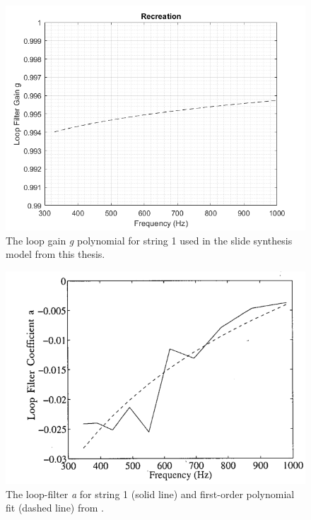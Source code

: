 \documentclass[../main.tex]{subfiles}
\begin{document}
\begin{figure}[h]
    \centering
    \includegraphics[scale=.65]{./images/plots/Figure18Recon.png}
    \caption{The loop gain \emph{g} polynomial for string 1 used in the slide synthesis model from this thesis.}
    \label{fig:Fig18Recon}
\end{figure}

\begin{figure}[h]
    \centering
    \includegraphics[scale=.75]{./images/plots/Figure19Orig.png}
    \caption{The loop-filter \emph{a} for string 1 (solid line) and first-order polynomial fit (dashed line) from .}
    \label{fig:Fig19Orig}
\end{figure}
\end{document}
